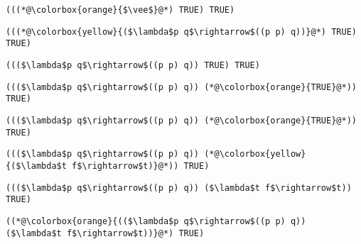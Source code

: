 \documentclass{beamer}
\begin{document}
\begin{frame}[fragile]{\CurrentSection}
\lstset{basicstyle=\ttfamily\small}\lstset{numbers=none}\lstset{language=ML}\begin{lstlisting}
(((*@\colorbox{orange}{$\vee$}@*) TRUE) TRUE)
\end{lstlisting}
\pause\lstset{language=ML}\begin{lstlisting}
(((*@\colorbox{yellow}{($\lambda$p q$\rightarrow$((p p) q))}@*) TRUE) TRUE)
\end{lstlisting}

\end{frame}

\begin{frame}[fragile]{\CurrentSection}
\lstset{basicstyle=\ttfamily\small}\lstset{numbers=none}\lstset{language=ML}\begin{lstlisting}
((($\lambda$p q$\rightarrow$((p p) q)) TRUE) TRUE)
\end{lstlisting}
\pause\lstset{language=ML}\begin{lstlisting}
((($\lambda$p q$\rightarrow$((p p) q)) (*@\colorbox{orange}{TRUE}@*)) TRUE)
\end{lstlisting}

\end{frame}

\begin{frame}[fragile]{\CurrentSection}
\lstset{basicstyle=\ttfamily\small}\lstset{numbers=none}\lstset{language=ML}\begin{lstlisting}
((($\lambda$p q$\rightarrow$((p p) q)) (*@\colorbox{orange}{TRUE}@*)) TRUE)
\end{lstlisting}
\pause\lstset{language=ML}\begin{lstlisting}
((($\lambda$p q$\rightarrow$((p p) q)) (*@\colorbox{yellow}{($\lambda$t f$\rightarrow$t)}@*)) TRUE)
\end{lstlisting}

\end{frame}

\begin{frame}[fragile]{\CurrentSection}
\lstset{basicstyle=\ttfamily\small}\lstset{numbers=none}\lstset{language=ML}\begin{lstlisting}
((($\lambda$p q$\rightarrow$((p p) q)) ($\lambda$t f$\rightarrow$t)) TRUE)
\end{lstlisting}
\pause\lstset{language=ML}\begin{lstlisting}
((*@\colorbox{orange}{(($\lambda$p q$\rightarrow$((p p) q)) ($\lambda$t f$\rightarrow$t))}@*) TRUE)
\end{lstlisting}

\end{frame}
\end{document}
